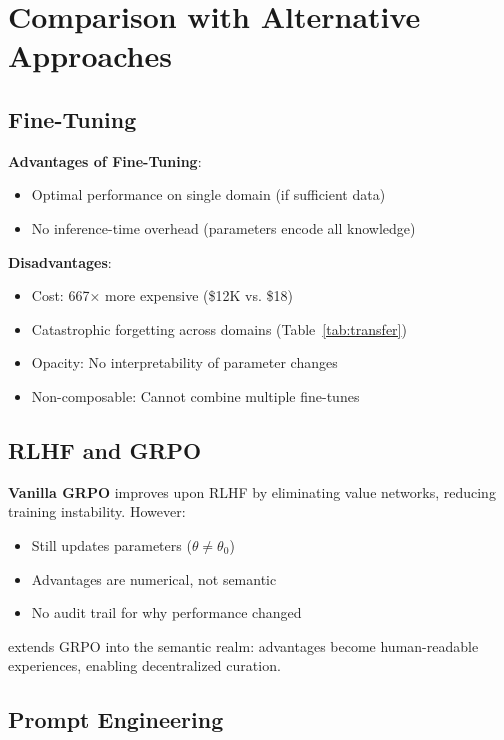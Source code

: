 \section{Comparison with Alternative Approaches}


\subsection{Fine-Tuning}

\textbf{Advantages of Fine-Tuning}:
\begin{itemize}
    \item Optimal performance on single domain (if sufficient data)
    \item No inference-time overhead (parameters encode all knowledge)
\end{itemize}

\textbf{Disadvantages}:
\begin{itemize}
    \item Cost: 667× more expensive (\$12K vs. \$18)
    \item Catastrophic forgetting across domains (Table~\ref{tab:transfer})
    \item Opacity: No interpretability of parameter changes
    \item Non-composable: Cannot combine multiple fine-tunes
\end{itemize}

\subsection{RLHF and GRPO}

\textbf{Vanilla GRPO} improves upon RLHF by eliminating value networks, reducing training instability. However:

\begin{itemize}
    \item Still updates parameters ($\theta \neq \theta_0$)
    \item Advantages are numerical, not semantic
    \item No audit trail for why performance changed
\end{itemize}

\textbf{\DSO{}} extends GRPO into the semantic realm: advantages become human-readable experiences, enabling decentralized curation.

\subsection{Prompt Engineering}

